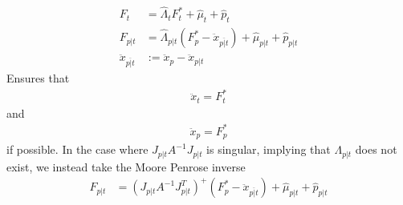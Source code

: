 \begin{align}
    F_t &= \hat \Lambda_t F_t^* + \hat{\mu}_t + \hat{p}_t \\
    F_{p|t} &= \hat \Lambda_{p|t} \left(F_{p}^* - \ddot{x}_{\overline{p|t}}\right) + \hat{\mu}_{p|t} + \hat{p}_{p|t} \\
    \ddot{x}_{\overline{p|t}} &:= \ddot{x}_p - \ddot{x}_{p|t}
\end{align}
Ensures that
\begin{align}
    \ddot x_t = F_t^*
\end{align}
and
\begin{align}
    \ddot x_p = F_p^*
\end{align}
if possible. In the case where $J_{p|t} A^{-1} J_{p|t}$ is singular, implying
that $\Lambda_{p|t}$ does not exist, we instead take the Moore Penrose inverse 
\begin{align}
    F_{p|t} &= \left(J_{p|t} A^{-1} J_{p|t}^T\right)^{+} \left(F_{p}^* - \ddot{x}_{\overline{p|t}}\right) + \hat{\mu}_{p|t} + \hat{p}_{p|t} \\
\end{align}

